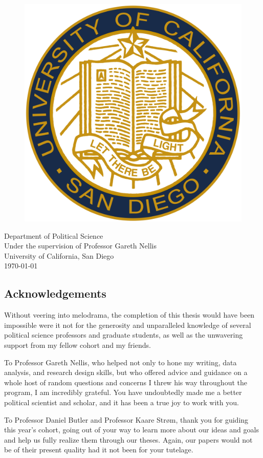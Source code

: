 \documentclass[12pt]{article}
\begin{document}
\begin{titlepage}
\vfill
\begin{figure}[H]
\begin{center}
\includegraphics[width = .2\textwidth]{ucsd_seal.png}
\end{center}
\end{figure}

\begin{center}	
Department of Political Science\\
Under the supervision of Professor Gareth Nellis\\
University of California, San Diego\\
\today
\end{center}

\end{titlepage}


\tableofcontents

\listoffigures

\listoftables

\pagebreak


\begin{center}\section*{Acknowledgements}\end{center}
Without veering into melodrama, the completion of this thesis would have been impossible were it not for the generosity and unparalleled knowledge of several political science professors and graduate students, as well as the unwavering support from my fellow cohort and my friends. 

To Professor Gareth Nellis, who helped not only to hone my writing, data analysis, and research design skills, but who offered advice and guidance on a whole host of random questions and concerns I threw his way throughout the program, I am incredibly grateful. You have undoubtedly made me a better political scientist and scholar, and it has been a true joy to work with you.   

To Professor Daniel Butler and Professor Kaare Strøm, thank you for guiding this year's cohort, going out of your way to learn more about our ideas and goals and help us fully realize them through our theses. Again, our papers would not be of their present quality had it not been for your tutelage.
\end{document}
